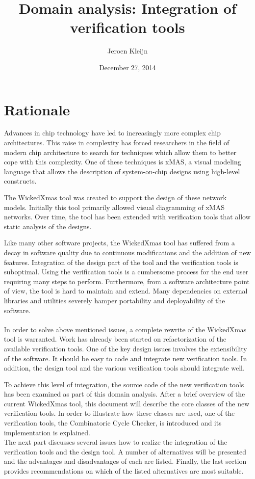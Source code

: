 \documentclass[a4paper,11pt]{article}
\title{Domain analysis: Integration of verification tools}
\date{December 27, 2014}
\author{Jeroen Kleijn}
\begin{document}
\maketitle

\section{Rationale}

Advances in chip technology have led to increasingly more complex chip
architectures. This raise in complexity has forced researchers in the field of
modern chip architecture to search for techniques which allow them to better cope
with this complexity. One of these techniques is xMAS\cite{chatterjee10,xmas}, a visual modeling
language that allows the description of system-on-chip designs using high-level constructs.

The WickedXmas\cite{13_toolxmas} tool was created to support the design of these network
models. Initially this tool primarily allowed visual diagramming of xMAS networks.
Over time, the tool has been extended with verification tools that allow static
analysis of the designs.

Like many other software projects, the WickedXmas tool has suffered from a decay in
software quality due to continuous modifications and the addition of new features.
Integration of the design part of the tool and the verification tools is suboptimal.
Using the verification tools is a cumbersome process for the end user requiring many
steps to perform. Furthermore, from a software architecture point of view, the tool
is hard to maintain and extend. Many dependencies on external libraries and utilities
severely hamper portability and deployability of the software.

\paragraph{}
In order to solve above mentioned issues, a complete rewrite of the WickedXmas tool is
warranted. Work has already been started on refactorization of the available verification tools.
One of the key design issues involves the extensibility of the software. It should be
easy to code and integrate new verification tools. In addition, the design tool and
the various verification tools should integrate well.

To achieve this level of integration, the source code of the new verification tools has
been examined as part of this domain analysis. After a brief overview of the current
WickedXmas tool, this document will describe the core classes of the new verification tools.
In order to illustrate how these classes are used, one of the verification tools,
the Combinatoric Cycle Checker, is introduced and its implementation is explained.\\
The next part discusses several issues how to realize the integration of the verification
tools and the design tool. A number of alternatives will be presented and the advantages
and disadvantages of each are listed. Finally, the last section provides recommendations on which
of the listed alternatives are most suitable.
\end{document}
